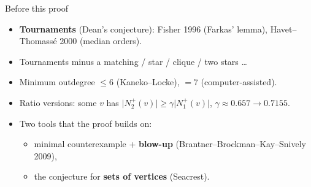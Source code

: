 \documentclass[aspectratio=169,11pt]{beamer}
\newcommand{\abs}[1]{\lvert #1\rvert}
\newcommand{\Nout}{N^+_1}
\newcommand{\Ntwo}{N^+_2}
\begin{document}
\begin{frame}{Before this proof}
\begin{itemize}
\item \textbf{Tournaments} (Dean's conjecture): Fisher 1996 (Farkas' lemma),
Havet--Thomass\'e 2000 (median orders).
\item Tournaments minus a matching / star / clique / two stars \ldots
\item Minimum outdegree $\le 6$ (Kaneko--Locke), $=7$ (computer-assisted).
\item Ratio versions: some $v$ has $\abs{\Ntwo(v)}\ge\gamma\abs{\Nout(v)}$,
$\gamma\approx0.657\to0.7155$.
\item Two tools that the proof builds on:
 \begin{itemize}
 \item minimal counterexample + \textbf{blow-up} (Brantner--Brockman--Kay--Snively 2009),
 \item the conjecture for \textbf{sets of vertices} (Seacrest).
 \end{itemize}
\end{itemize}
\end{frame}
\end{document}
